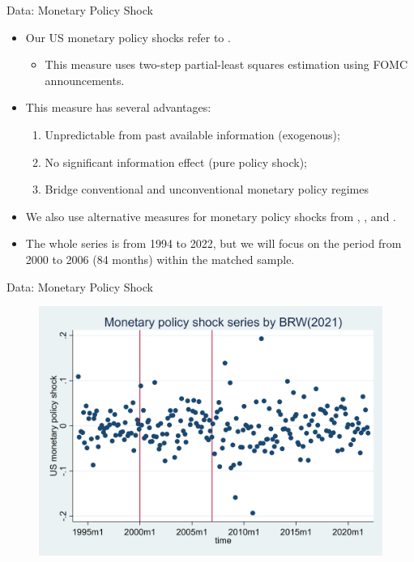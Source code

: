 \documentclass[10pt]{beamer}
\begin{document}
\begin{frame}{Data: Monetary Policy Shock}
    \begin{itemize}
        \item Our US monetary policy shocks refer to \cite{bu2021unified}.
        \begin{itemize}
            \item This measure uses \cite{fama1973risk} two-step partial-least squares estimation using FOMC announcements.
        \end{itemize}
        \item This measure has several advantages:
        \begin{enumerate}
            \item Unpredictable from past available information (exogenous);
            \item No significant information effect (pure policy shock);
            \item Bridge conventional and unconventional monetary policy regimes
        \end{enumerate}
        \item We also use alternative measures for monetary policy shocks from \cite{nakamura2018high}, \cite{guraynak2005actions}, and \cite{jarocinski2020deconstructing}.
        \item The whole series is from 1994 to 2022, but we will focus on the period from 2000 to 2006 (84 months) within the matched sample.
    \end{itemize}
\end{frame}

\begin{frame}{Data: Monetary Policy Shock}
    \begin{figure}[htbp]
	\centering
	\includegraphics[width=0.9\columnwidth]{latex/drafts/pic/BRW.png}
	\label{sum.brw}
    \end{figure}
\end{frame}
\end{document}
